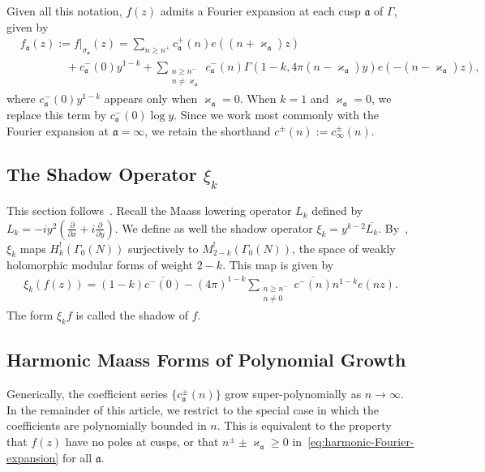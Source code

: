\documentclass[11pt,reqno]{amsart}
\theoremstyle{plain}
\theoremstyle{definition}
\numberwithin{equation}{section}
\begin{document}
Given all this notation, $f(z)$ admits a Fourier expansion at each cusp $\mathfrak{a}$ of $\Gamma$, given by
\begin{align} \label{eq:harmonic-Fourier-expansion-general}
	& f_\mathfrak{a}(z) := f\vert_{\sigma_{\mathfrak{a}}}(z) 
		= \sum_{n \geq n^+}   c_\mathfrak{a}^+(n) e((n+\varkappa_\mathfrak{a})z) \\
	& \qquad \qquad + c_\mathfrak{a}^-(0)y^{1-k} 
		+ \sum_{\substack{n \geq n^- \\ n \neq \varkappa_\mathfrak{a} }}
		c_\mathfrak{a}^-(n) \Gamma(1-k,4\pi (n - \varkappa_\mathfrak{a}) y) e(-(n-\varkappa_\mathfrak{a})z),
\end{align}
where $c_\mathfrak{a}^-(0) y^{1-k}$ appears only when $\varkappa_\mathfrak{a} = 0$. When $k=1$ and $\varkappa_\mathfrak{a}=0$, we replace this term by $c_\mathfrak{a}^-(0) \log y$. Since we work most commonly with the Fourier expansion at $\mathfrak{a} = \infty$, we retain the shorthand $c^\pm(n) := c_\infty^\pm(n)$.

\subsection{The Shadow Operator \texorpdfstring{$\xi_k$}{xi}}

This section follows~\cite[\S{5.1}]{BFOR19}. Recall the Maass lowering operator $L_k$ defined by $L_k = -iy^2(\frac{\partial}{\partial x} + i \frac{\partial}{\partial y})$. We define as well the shadow operator $\xi_k = y^{k -2} \overline{L_k}$. By~\cite[Theorem 5.10]{BFOR19}, $\xi_{k}$ maps $H_{k}^!(\Gamma_0(N))$ surjectively to $M_{2-k}^!(\Gamma_0(N))$, the space of weakly holomorphic modular forms of weight $2-k$. This map is given by
\begin{align} \label{eq:shadow-definition}
	\xi_{k}(f(z)) = (1-k) \overline{c^-(0)} 
	- (4\pi)^{1-k} \sum_{\substack{n \geq n^- \\ n \neq 0}} \overline{c^-(n)} n^{1-k} e(nz).
\end{align}
The form $\xi_{k} f$ is called the shadow of $f$.

\subsection{Harmonic Maass Forms of Polynomial Growth} \label{sec:harmonic-Maass-polynomial-growth}

Generically, the coefficient series $\{c_\mathfrak{a}^\pm(n)\}$ grow super-polynomially as $n \to \infty$. In the remainder of this article, we restrict to the special case in which the coefficients are polynomially bounded in $n$. This is equivalent to the property that $f(z)$ have no poles at cusps, or that $n^\pm \pm \varkappa_\mathfrak{a} \geq 0$ in~\eqref{eq:harmonic-Fourier-expansion} for all $\mathfrak{a}$.
\end{document}
